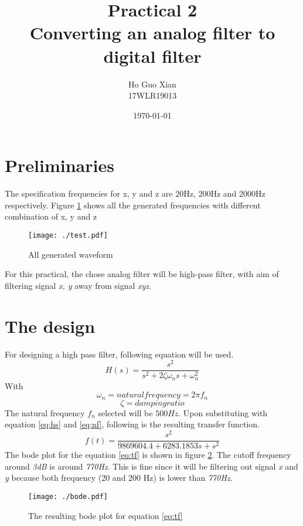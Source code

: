 \documentclass{article}
\author{Ho Guo Xian\\{\small 17WLR19013}}
\title{Practical 2\\Converting an analog filter to digital filter}
\date{\today}
\begin{document}
\maketitle
\section{Preliminaries}
The specification frequencies for x, y and z are 20Hz, 200Hz and 2000Hz respectively. Figure \ref{fig:all_freq} shows all the generated frequencies with different combination of x, y and z

\begin{figure}[htpb]
    \centering
    \texttt{[image: ./test.pdf]}
    \caption{All generated waveform}
    \label{fig:all_freq}
\end{figure}

For this practical, the chose analog filter will be high-pass filter, with aim of filtering signal \textit{x, y} away from signal \textit{xyz}.  

\section{The design}
For designing a high pass filter, following equation will be used.
\begin{equation}
    \label{eq:hs}
    H(s) = \frac{s^2}{s^2 + 2 \zeta \omega_n s + \omega_n^2}
\end{equation}
With 
\begin{equation}
    \label{eq:nf}
    \omega_n = natural frequency = 2\pi f_n
\end{equation}
\begin{equation}
    \zeta = damping ratio
\end{equation}
The natural frequency $f_n$ selected will be $500Hz$. Upon substituting with equation \ref{eq:hs} and \ref{eq:nf}, following is the resulting transfer function.
\begin{equation}
    \label{eq:tf}
    f(t) = \frac{s^2}{9869604.4 + 6283.1853s + s^2}
\end{equation}
The bode plot for the equation \ref{eq:tf} is shown in figure \ref{fig:bode}. The cutoff frequency around \textit{3dB} is around \textit{770Hz}. This is fine since it will be filtering out signal \textit{x} and \textit{y} because both frequency (20 and 200 Hz) is lower than \textit{770Hz}. 
\begin{figure}[htpb]
    \centering
    \texttt{[image: ./bode.pdf]}
    \caption{The resulting bode plot for equation \ref{eq:tf}}
    \label{fig:bode}
\end{figure}
\end{document}
